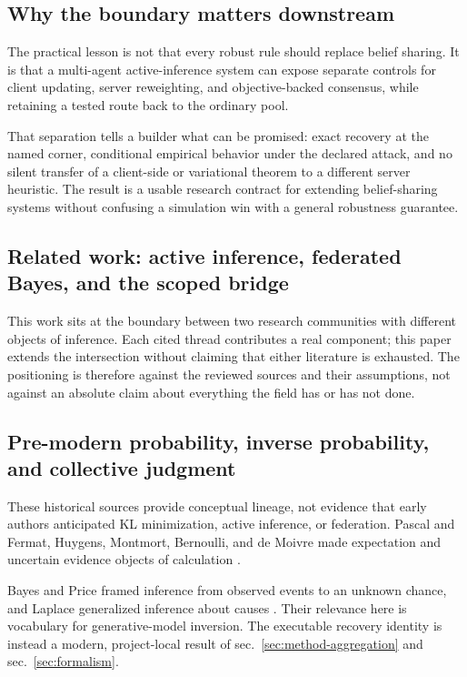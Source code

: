 \documentclass[
  english,
]{article}
\theoremstyle{plain}
\theoremstyle{definition}
\theoremstyle{remark}
\theoremstyle{definition}
\begin{document}
\subsection{Why the boundary matters
downstream}\label{sec:discussion-downstream}

The practical lesson is not that every robust rule should replace belief
sharing. It is that a multi-agent active-inference system can expose
separate controls for client updating, server reweighting, and
objective-backed consensus, while retaining a tested route back to the
ordinary pool.

That separation tells a builder what can be promised: exact recovery at
the named corner, conditional empirical behavior under the declared
attack, and no silent transfer of a client-side or variational theorem
to a different server heuristic. The result is a usable research
contract for extending belief-sharing systems without confusing a
simulation win with a general robustness guarantee.

\subsection{Related work: active inference, federated Bayes, and the
scoped bridge}\label{sec:related-work}

This work sits at the boundary between two research communities with
different objects of inference. Each cited thread contributes a real
component; this paper extends the intersection without claiming that
either literature is exhausted. The positioning is therefore against the
reviewed sources and their assumptions, not against an absolute claim
about everything the field has or has not done.

\subsection{Pre-modern probability, inverse probability, and collective
judgment}\label{sec:related-historical}

These historical sources provide conceptual lineage, not evidence that
early authors anticipated KL minimization, active inference, or
federation. Pascal and Fermat, Huygens, Montmort, Bernoulli, and de
Moivre made expectation and uncertain evidence objects of calculation
\citep{pascal1654probability, huygens1657ratiociniis, montmort1708essay, bernoulli1713ars, demoivre1718doctrine}.

Bayes and Price framed inference from observed events to an unknown
chance, and Laplace generalized inference about causes
\citep{bayes1763essay, laplace1774memoire}. Their relevance here is
vocabulary for generative-model inversion. The executable recovery
identity is instead a modern, project-local result of
sec.~\ref{sec:method-aggregation} and sec.~\ref{sec:formalism}.
\end{document}

